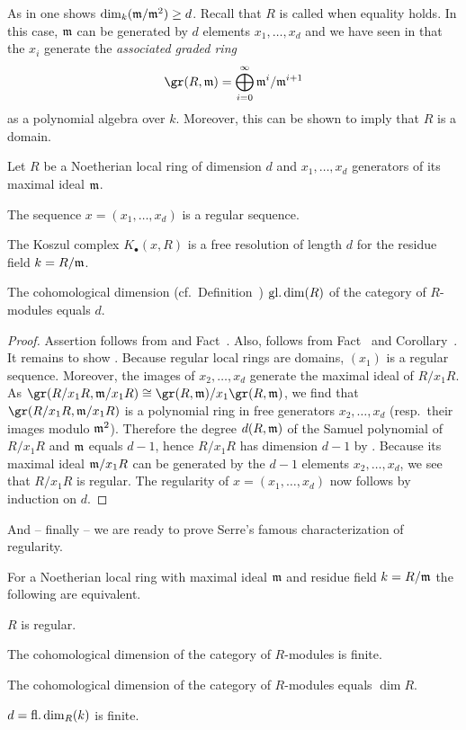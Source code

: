\documentclass[a4paper,parskip=half,numbers=enddot, DIV=12]{scrreprt}
\begin{document}
As in \cite[Proposition~1.3.1]{alg2} one shows $\dim_k(\mathfrak{m}/\mathfrak{m}^2)\geq d$. Recall that $R$ is called  when equality holds. In this case, $\mathfrak{m}$ can be generated by $d$ elements $x_1,\ldots,x_d$ and we have seen in \cite[Corollary~3.4.9]{alg2} that the $x_i$ generate the \emph{associated graded ring}
\begin{align*}
	\gr(R,\mm)=\bigoplus_{i=0}^\infty\mm^i/\mm^{i+1}
\end{align*}
as a polynomial algebra over $k$. Moreover, this can be shown to imply that $R$ is a domain.
\begin{prop}
	Let $R$ be a Noetherian local ring of dimension $d$ and $x_1,\ldots,x_d$ generators of its maximal ideal $\mathfrak{m}$.
	\begin{alphanumerate}
		\item The sequence $x=(x_1,\ldots,x_d)$ is a regular sequence.
		\item The Koszul complex $K_\bullet(x,R)$ is a free resolution of length $d$ for the residue field $k=R/\mathfrak{m}$.
		\item The cohomological dimension (cf.\ Definition~) $\operatorname{gl.dim}(R)$ of the category of $R$-modules equals $d$.
	\end{alphanumerate}
\end{prop}
\begin{proof}
	Assertion  follows from  and Fact~. Also,  follows from Fact~ and Corollary~. It remains to show . Because regular local rings are domains, $(x_1)$ is a regular sequence. Moreover, the images of $x_2,\ldots,x_d$ generate the maximal ideal of $R/x_1R$. As $\gr(R/x_1R,\mm/x_1R)\cong \gr(R,\mm)/x_1\gr(R,\mm)$, we find that $\gr(R/x_1R,\mm/x_1R)$ is a polynomial ring in free generators $x_2,\ldots,x_d$ (resp.\ their images modulo $\mathfrak{m}^2$). Therefore the degree $d(R,\mathfrak{m})$ of the Samuel polynomial of $R/x_1R$ and $\mathfrak{m}$ equals $d-1$, hence $R/x_1R$ has dimension $d-1$ by \cite[Theorem~20]{alg2}. Because its maximal ideal $\mathfrak{m}/x_1R$ can be generated by the $d-1$ elements $x_2,\ldots,x_d$, we see that $R/x_1R$ is regular. The regularity of $x=(x_1,\ldots,x_d)$ now follows by induction on $d$.
\end{proof}
And -- finally -- we are ready to prove Serre's famous characterization of regularity.
\begin{thm}[Serre]
	For a Noetherian local ring with maximal ideal $\mathfrak{m}$ and residue field $k=R/\mathfrak{m}$ the following are equivalent.
	\begin{alphanumerate}
		\item $R$ is regular.
		\item The cohomological dimension of the category of $R$-modules is finite.
		\item The cohomological dimension of the category of $R$-modules equals $\dim R$.
		\item $d=\operatorname{fl.dim}_R(k)$ is finite.
	\end{alphanumerate}
\end{thm}
\end{document}
